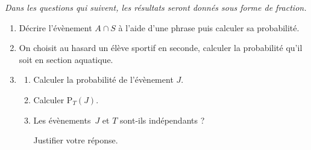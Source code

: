 \documentclass[10pt]{article}
\begin{document}
	\emph{Dans les questions qui suivent, les résultats seront donnés sous forme de fraction.}

	\begin{enumerate}[resume]
		\item Décrire l'évènement $A \cap S$ à l'aide d'une phrase puis calculer sa probabilité.

		\item On choisit au hasard un élève sportif en seconde, calculer la probabilité qu'il soit en section aquatique.

		\item \begin{enumerate}
			\item Calculer la probabilité de l'évènement $J$.
			\item Calculer $\mathrm{P}_{T}(J)$.
			\item Les évènements\, $J$ et $T$ sont-ils indépendants ?

			Justifier votre réponse.
		\end{enumerate}
	\end{enumerate}
\end{document}
